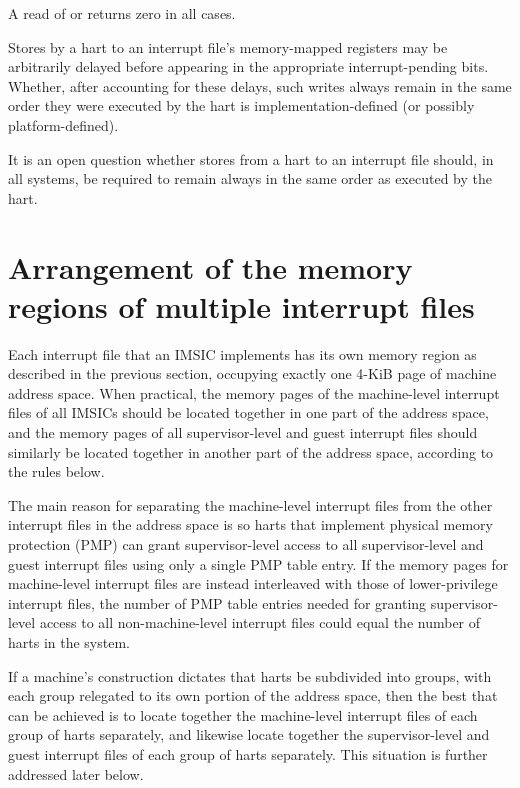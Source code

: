 A read of  or  returns zero in all
cases.

Stores by a hart to an interrupt file's memory-mapped registers
may be arbitrarily delayed before appearing in the appropriate
interrupt-pending bits.
Whether, after accounting for these delays, such writes always
remain in the same order they were executed by the hart is
implementation-defined (or possibly platform-defined).

\begin{commentary}
It is an open question whether stores from a hart to an interrupt file
should, in all systems, be required to remain always in the same order
as executed by the hart.
\end{commentary}

\section{Arrangement of the memory regions of multiple interrupt files}
\label{sec:IMSIC-systemMemRegions}

Each interrupt file that an IMSIC implements has its own memory
region as described in the previous section, occupying exactly one
\mbox{4-KiB} page of machine address space.
When practical, the memory pages of the machine-level interrupt files
of all IMSICs should be located together in one part of the address
space, and the memory pages of all supervisor-level and guest interrupt
files should similarly be located together in another part of the
address space, according to the rules below.

\begin{commentary}
The main reason for separating the machine-level interrupt files
from the other interrupt files in the address space is so harts that
implement physical memory protection (PMP) can grant supervisor-level
access to all supervisor-level and guest interrupt files using only a
single PMP table entry.
If the memory pages for machine-level interrupt files are instead
interleaved with those of lower-privilege interrupt files, the number
of PMP table entries needed for granting supervisor-level access to all
non-machine-level interrupt files could equal the number of harts in
the system.
\end{commentary}

If a machine's construction dictates that harts be subdivided into
groups, with each group relegated to its own portion of the address
space, then the best that can be achieved is to locate together the
machine-level interrupt files of each group of harts separately, and
likewise locate together the supervisor-level and guest interrupt files
of each group of harts separately.
This situation is further addressed later below.


